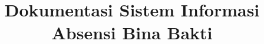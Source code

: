 \documentclass[12pt,a4paper]{article}
\begin{document}

\title{Dokumentasi Sistem Informasi\\Absensi Bina Bakti}
\author{}
\maketitle
\newpage

\tableofcontents
\newpage







\end{document}
